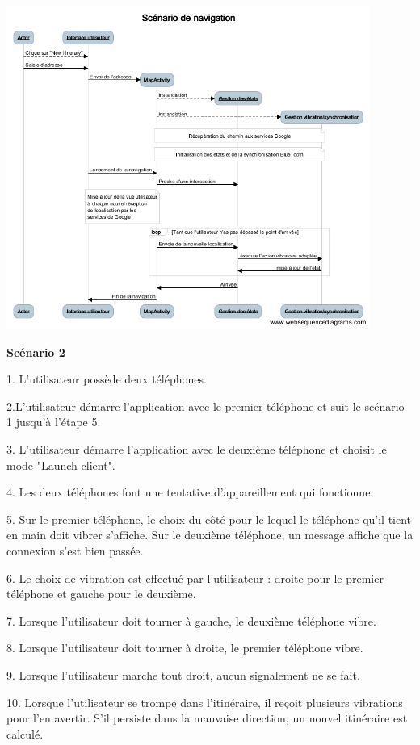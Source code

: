 {\begin{center}
\includegraphics[height=400px]{Assets/scenario1.png}
\end{center}



\textbf{Scénario 2}

1. L'utilisateur possède deux téléphones.

2.L'utilisateur démarre l'application avec le premier téléphone et suit le scénario 1 jusqu'à l'étape 5.

3. L'utilisateur démarre l'application avec le deuxième téléphone et choisit le mode "Launch client".

4. Les deux téléphones font une tentative d'appareillement qui fonctionne.

5. Sur le premier téléphone, le choix du côté pour le lequel le téléphone qu'il tient en main doit vibrer s'affiche. Sur le deuxième téléphone, un message affiche que la connexion s'est bien passée.

6. Le choix de vibration est effectué par l'utilisateur : droite pour le premier téléphone et gauche pour le deuxième.

7. Lorsque l'utilisateur doit tourner à gauche, le deuxième téléphone vibre.

8. Lorsque l'utilisateur doit tourner à droite, le premier téléphone vibre.

9. Lorsque l'utilisateur marche tout droit, aucun signalement ne se fait.

10. Lorsque l'utilisateur se trompe dans l'itinéraire, il reçoit  plusieurs vibrations pour l'en avertir. S'il persiste dans la mauvaise direction, un nouvel itinéraire est calculé.

}
